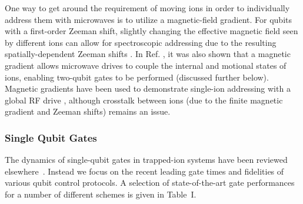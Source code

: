 \documentclass[%
12pt,
 amsmath,amssymb,
]{revtex4-2}
\begin{document}
One way to get around the requirement of moving ions in order to individually address them with microwaves is to utilize a magnetic-field gradient. For qubits with a first-order Zeeman shift, slightly changing the effective magnetic field seen by different ions can allow for spectroscopic addressing due to the resulting spatially-dependent Zeeman shifts \cite{MintertMicrowaveScheme2001}. In Ref. \cite{MintertMicrowaveScheme2001}, it was also shown that a magnetic gradient allows microwave drives to couple the internal and motional states of ions, enabling two-qubit gates to be performed (discussed further below). Magnetic gradients have been used to demonstrate single-ion addressing with a global RF drive \cite{JohanningRFAddress2009}, although crosstalk between ions (due to the finite magnetic gradient and Zeeman shifts) remains an issue.


    \subsubsection{Single Qubit Gates}
The dynamics of single-qubit gates in trapped-ion systems have been reviewed elsewhere~\cite{leibfried2003quantum}. Instead we focus on the recent leading gate times and fidelities of various qubit control protocols. A selection of state-of-the-art gate performances for a number of different schemes is given in Table~I.
\end{document}
